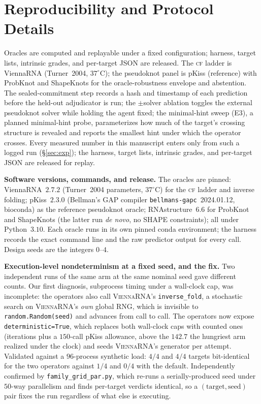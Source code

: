 \documentclass[11pt]{article}
\newcommand{\CF}{\textsc{cf}}
\begin{document}
\section{Reproducibility and Protocol Details}\label{app:repro}
Oracles are computed and replayable under a fixed configuration; harness, target lists, intrinsic grades,
and per-target JSON are released. The \CF{} ladder is ViennaRNA (Turner~2004, $37^\circ$C); the pseudoknot
panel is pKiss (reference) with ProbKnot and ShapeKnots for the oracle-robustness envelope and abstention.
The sealed-commitment step records a hash and timestamp of each prediction before the held-out adjudicator is run; the
$\pm$solver ablation toggles the external pseudoknot solver while holding the agent fixed; the minimal-hint
sweep (E3), a planned minimal-hint probe, parameterizes how much of the target's crossing structure is
revealed and reports the smallest hint under which the operator crosses. Every measured number in this manuscript
enters only from such a logged run (\S\ref{sec:exp}); the harness, target lists, intrinsic grades, and
per-target JSON are released for replay.

\smallskip\noindent\textbf{Software versions, commands, and release.} The oracles are pinned:
ViennaRNA~$2.7.2$ (Turner~2004 parameters, $37^\circ$C) for the \CF{} ladder and inverse folding; pKiss~$2.3.0$
(Bellman's GAP compiler \texttt{bellmans-gapc}~2024.01.12, bioconda) as the reference pseudoknot oracle;
RNAstructure~$6.6$ for ProbKnot and ShapeKnots (the latter run \emph{de novo}, no SHAPE constraints); all under
Python~$3.10$. Each oracle runs in its own pinned conda environment; the harness records the exact command line
and the raw predictor output for every call. Design seeds are the integers $0$--$4$.

\smallskip\noindent\textbf{Execution-level nondeterminism at a fixed seed, and the fix.} Two independent runs
of the same arm at the same nominal seed gave different counts. Our first diagnosis, subprocess timing under a
wall-clock cap, was incomplete: the operators also call \textsc{ViennaRNA}'s \texttt{inverse\_fold}, a
stochastic search on \textsc{ViennaRNA}'s \emph{own} global RNG, which is invisible to
\texttt{random.Random(seed)} and advances from call to call. The operators now expose
\texttt{deterministic=True}, which replaces both wall-clock caps with counted ones (iterations plus a $150$-call
pKiss allowance, above the $142.7$ the hungriest arm realized under the clock) and seeds \textsc{ViennaRNA}'s
generator per attempt. Validated against a $96$-process synthetic load: $4/4$ and $4/4$ targets bit-identical
for the two operators against $1/4$ and $0/4$ with the default. Independently confirmed by
\texttt{family\_grid\_par.py}, which re-runs a serially-produced seed under $50$-way parallelism and finds
per-target verdicts identical, so a $(\text{target},\text{seed})$ pair fixes the run regardless of what else is
executing.
\end{document}
